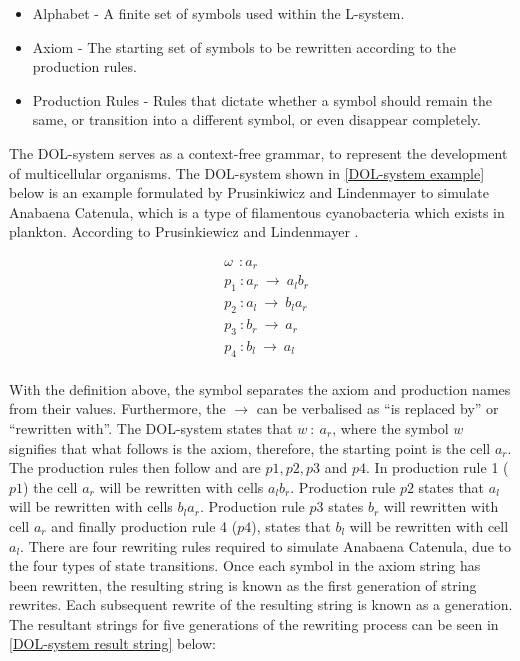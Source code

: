 \begin{singlespace}
\begin{itemize}
	\item Alphabet - A finite set of symbols used within the L-system.
	\item Axiom - The starting set of symbols to be rewritten according to the production rules.
	\item Production Rules - Rules that dictate whether a symbol should remain the same, or transition into a different symbol, or even disappear completely.
\end{itemize} 
\end{singlespace}
\noindent
The DOL-system serves as a context-free grammar, to represent the development of multicellular organisms. The DOL-system shown in \ref{DOL-system example} below is an example formulated by Prusinkiwicz and Lindenmayer to simulate Anabaena Catenula, which is a type of filamentous cyanobacteria which exists in plankton. According to Prusinkiewicz and Lindenmayer  \cite{prusinkiewicz2012algorithmic}.

\begin{equation} \label{DOL-system example}
\begin{aligned}
	&\omega~~ : a_r \\
	&p_1~ :  a_r~ \rightarrow~ a_l b_r\\
	&p_2~ :  a_l~ \rightarrow~ b_l a_r\\
	&p_3~ :  b_r~ \rightarrow~ a_r\\
	&p_4~ :  b_l~ \rightarrow~ a_l\\
\end{aligned}
\end{equation}

\noindent
With the definition above, the \say{:} symbol separates the axiom and production names from their values. Furthermore, the $\rightarrow$ can be verbalised as ``is replaced by'' or ``rewritten with''. The DOL-system states that $w~ :~ a_r$, where the symbol $w$ signifies that what follows is the axiom, therefore, the starting point is the cell $a_r$. The production rules then follow and are $p1, p2, p3$ and $p4$. In production rule 1 ($p1$) the cell $a_r$ will be rewritten with cells $a_l b_r$. Production rule $p2$ states that $a_l$ will be rewritten with cells $b_l a_r$. Production rule $p3$ states $b_r$ will rewritten with cell $a_r$ and finally production rule 4 ($p4$), states that $b_l$ will be rewritten with cell $a_l$. There are four rewriting rules required to simulate Anabaena Catenula, due to the four types of state transitions. Once each symbol in the axiom string has been rewritten, the resulting string is known as the first generation of string rewrites. Each subsequent rewrite of the resulting string is known as a generation. The resultant strings for five generations of the rewriting process can be seen in \ref{DOL-system result string} below:

